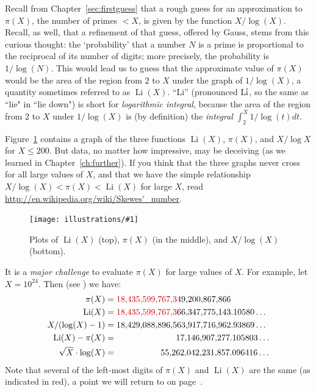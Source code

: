 \documentclass[openany]{book}
\DeclareMathOperator{\Li}{Li}
\newcommand{\ill}[3]{%
   \begin{figure}[H]%
   \vspace{-2ex}
   \centering%
   \texttt{[image: illustrations/\#1]}%
   \caption{#3}%
   \vspace{-2ex}
    \end{figure}}
\theoremstyle{plain}
\theoremstyle{definition}
\begin{document}
Recall from Chapter~\ref{sec:firstguess} that a rough guess for an approximation to
$\pi(X)$, the number of primes $< X$, is given by the function
$X/\log(X)$. Recall, as well, that a refinement of that guess, offered by Gauss, stems from this curious thought:  the `probability' that a number $N$ is a prime  is proportional to the reciprocal of its number of digits; more precisely, the probability is $1/\log(N)$.  This would lead us to  guess that the approximate value of $\pi(X)$ would be
the area of the region from $2$ to $X$ under the graph of
$1/\log(X)$, a quantity sometimes referred to as $\Li(X)$.
``Li'' (pronounced L$\overline{\rm i}$, so the same as ``lie" in ``lie down")
is short for {\em logarithmic integral},
because the area of the region from $2$ to $X$ under $1/\log(X)$
is (by definition) the {\em integral} $\int_2^X 1/\log(t) dt$.




Figure~\ref{fig:threeplots} contains a graph of the three functions
$\Li(X)$, $\pi(X)$, and $X/\log X$ for $X\leq 200$.
But data, no matter how impressive, may be deceiving (as we learned in
Chapter~\ref{ch:further}). If you think
that  the three graphs  never cross for all large values of $X$,  and
that we have the simple relationship  $X/\log(X) < \pi(X) < \Li(X)$ for
large $X$, read \url{http://en.wikipedia.org/wiki/Skewes'_number}.


\ill{three_plots}{.9}{Plots of $\Li(X)$ (top), $\pi(X)$ (in the middle), and $X/\log(X)$ (bottom).\label{fig:threeplots}}

It is a {\em major challenge} to
evaluate $\pi(X)$ for large values of $X$.
For example, let $X=10^{24}$.
Then \label{pili_vals} (see ) we have:
\begin{align*}
  \pi(X) &= {\color{dredcolor} 18{,}435{,}599{,}767{,}3}49{,}200{,}867{,}866\\
  \Li(X) &= {\color{dredcolor}18{,}435{,}599{,}767{,}3}66{,}347{,}775{,}143.10580\ldots \\
  X/(\log(X)-1)  &=
            18{,}429{,}088{,}896{,}563{,}917{,}716{,}962.93869\ldots\\
  \Li(X) - \pi(X) &= \hspace{7em}
     17{,}146{,}907{,}277.105803\ldots\\
  \sqrt{X}\cdot \log(X) &= \hspace{5.2em}
     55{,}262{,}042{,}231{,}857.096416 \ldots
\end{align*}
Note that several of the left-most digits of $\pi(X)$ and $\Li(X)$ are the
same (as indicated in red), a point we will return to on page~\pageref{page:leftmost}.
\end{document}
